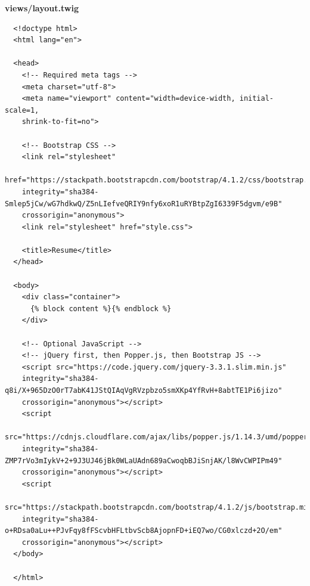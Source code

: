\documentclass{article}
\begin{document}
\textbf{views/layout.twig}
\begin{verbatim}
  <!doctype html>
  <html lang="en">

  <head>
    <!-- Required meta tags -->
    <meta charset="utf-8">
    <meta name="viewport" content="width=device-width, initial-scale=1,
    shrink-to-fit=no">

    <!-- Bootstrap CSS -->
    <link rel="stylesheet"
    href="https://stackpath.bootstrapcdn.com/bootstrap/4.1.2/css/bootstrap.min.css"
    integrity="sha384-Smlep5jCw/wG7hdkwQ/Z5nLIefveQRIY9nfy6xoR1uRYBtpZgI6339F5dgvm/e9B"
    crossorigin="anonymous">
    <link rel="stylesheet" href="style.css">

    <title>Resume</title>
  </head>

  <body>
    <div class="container">
      {% block content %}{% endblock %}
    </div>

    <!-- Optional JavaScript -->
    <!-- jQuery first, then Popper.js, then Bootstrap JS -->
    <script src="https://code.jquery.com/jquery-3.3.1.slim.min.js"
    integrity="sha384-q8i/X+965DzO0rT7abK41JStQIAqVgRVzpbzo5smXKp4YfRvH+8abtTE1Pi6jizo"
    crossorigin="anonymous"></script>
    <script
    src="https://cdnjs.cloudflare.com/ajax/libs/popper.js/1.14.3/umd/popper.min.js"
    integrity="sha384-ZMP7rVo3mIykV+2+9J3UJ46jBk0WLaUAdn689aCwoqbBJiSnjAK/l8WvCWPIPm49"
    crossorigin="anonymous"></script>
    <script
    src="https://stackpath.bootstrapcdn.com/bootstrap/4.1.2/js/bootstrap.min.js"
    integrity="sha384-o+RDsa0aLu++PJvFqy8fFScvbHFLtbvScb8AjopnFD+iEQ7wo/CG0xlczd+2O/em"
    crossorigin="anonymous"></script>
  </body>

  </html>
\end{verbatim}
\end{document}
